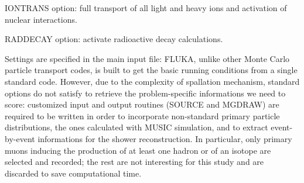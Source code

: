 IONTRANS option: full transport of all light and heavy ions and activation of nuclear interactions.

RADDECAY option: activate radioactive decay calculations.

Settings are specified in the main input file: FLUKA, unlike other Monte Carlo particle transport codes, is built to get the basic running conditions from a single standard code. However, due to the complexity of spallation mechanism, standard options do not satisfy to retrieve the problem-specific informations we need to score: customized input and output routines (SOURCE and MGDRAW) are required to be written in order to incorporate non-standard primary particle distributions, the ones calculated with MUSIC simulation, and to extract event-by-event informations for the shower reconstruction. In particular, only primary muons inducing the production of at least one hadron or of an isotope are selected and recorded; the rest are not interesting for this study and are discarded to save computational time.